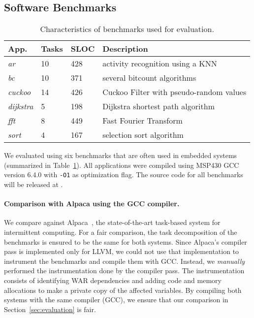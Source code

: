 \subsection{Software Benchmarks}
\label{sec:software_benchmarks}

\begin{table}%
\caption{Characteristics of benchmarks used for evaluation.}
\label{tab:one}
\begin{minipage}{\columnwidth}
\begin{center}
\begin{tabular}{llll}
  \toprule
		App.&Tasks&SLOC&Description\\
		\hline
        \emph{ar} &10 &428 & activity recognition using a KNN\\ %
        \emph{bc} &10 &371 & several bitcount algorithms\\
        \emph{cuckoo} &14 &426 & Cuckoo Filter with pseudo-random values\\
        \emph{dijkstra} &5 &198 & Dijkstra shortest path algorithm \\
        \emph{fft} &8 &449 & Fast Fourier Transform\\ %
		\emph{sort} &4 &167 & selection sort algorithm\\
  \bottomrule
\end{tabular}
\end{center}
\end{minipage}
\label{table:benchmark_table}
\end{table}%

We evaluated \sys using six benchmarks that are often used in embedded systems (summarized in Table~\ref{table:benchmark_table}). All applications were compiled using MSP430 GCC~\cite{ti-gcc} version 6.4.0 with \texttt{-O1} as optimization flag. The source code for all benchmarks will be released at \cite{coala_website}.

\paragraph{Comparison with Alpaca using the GCC compiler.}

We compare \sys against Alpaca~\cite{alpaca}, the state-of-the-art task-based system for intermittent computing. For a fair comparison, the task decomposition of the benchmarks is ensured to be the same for both systems.
%
Since Alpaca's compiler pass is implemented only for LLVM, we could not use that implementation to instrument the benchmarks and compile them with GCC. Instead, we \emph{manually} performed the instrumentation done by the compiler pass. The instrumentation consists of identifying WAR dependencies  and adding code and memory allocations to make a private copy of the affected variables.
By compiling both systems with the same compiler (GCC), we ensure that our comparison in Section~\ref{sec:evaluation} is fair.
